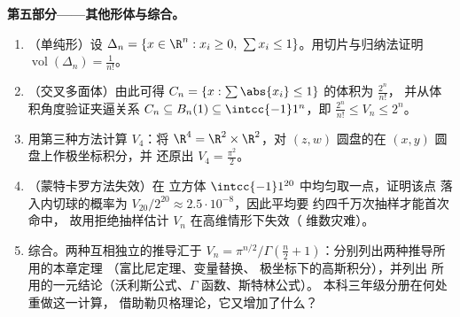 \begin{problem}[{周末问题——$V_n =
\pi^{n/2}/\Gamma(\frac n2 + 1)$，以及高维的
奇异现象}]
\medskip
\noindent\textbf{第五部分——其他形体与综合。}
\begin{enumerate}[resume]
  \item （单纯形）设 $\Delta_n = \{x \in \R^n : x_i \geq 0,\
        \sum x_i \leq 1\}$。用切片与归纳法证明
        $\operatorname{vol}(\Delta_n) = \frac1{n!}$。
  \item （交叉多面体）由此可得 $C_n = \{x :
        \sum\abs{x_i} \leq 1\}$ 的体积为 $\frac{2^n}{n!}$，
        并从体积角度验证夹逼关系 $C_n \subseteq B_n(1)
        \subseteq \intcc{-1}1^n$，即
        $\frac{2^n}{n!} \leq V_n \leq 2^n$。
  \item 用第三种方法计算 $V_4$：将 $\R^4 = \R^2 \times
        \R^2$，对 $(z, w)$ 圆盘的在
        $(x, y)$ 圆盘上作极坐标积分，并
        还原出 $V_4 = \frac{\pi^2}2$。
  \item （蒙特卡罗方法失效）在
        立方体 $\intcc{-1}1^{20}$ 中均匀取一点，证明该点
        落入内切球的概率为
        $V_{20}/2^{20} \approx 2.5\cdot10^{-8}$，因此平均要
        约四千万次抽样才能首次命中，
        故用拒绝抽样估计 $V_n$
        在高维情形下失效（
        维数灾难）。
  \item 综合。两种互相独立的推导汇于 $V_n =
        \pi^{n/2}/\Gamma(\frac n2 + 1)$：分别列出两种推导所用的本章定理
        （富比尼定理、变量替换、
        极坐标下的高斯积分），并列出
        所用的一元结论（沃利斯公式、$\Gamma$ 函数、斯特林公式）。
        本科三年级分册在何处重做这一计算，
        借助勒贝格理论，它又增加了什么？
\end{enumerate}
\end{problem}

